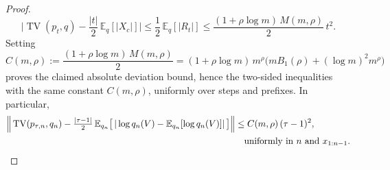 \begin{proof}
\[
\Big|\operatorname{TV}(p_t,q)-\frac{|t|}{2}\,\mathbb{E}_q[|X_c|]\Big|\le \frac12\,\mathbb{E}_q[|R_t|]\le \frac{(1+\rho\log m)\,M(m,\rho)}{2}\,t^2.
\]
Setting
\[
C(m,\rho):=\frac{(1+\rho\log m)\,M(m,\rho)}{2}=(1+\rho\log m)\,m^{\rho}\big(m B_1(\rho)+ (\log m)^2 m^{\rho}\big)
\]
proves the claimed absolute deviation bound, hence the two-sided inequalities with the same constant $C(m,\rho)$, uniformly over steps and prefixes. In particular,
\[
\begin{aligned}
\Big\|\operatorname{TV}(p_{\tau,n},q_n)-\tfrac{|\tau-1|}{2}\,\mathbb{E}_{q_n}\big[\,|\log q_n(V)-\mathbb{E}_{q_n}[\log q_n(V)]|\,\big]\Big\|
&\le C(m,\rho)\,(\tau-1)^2,\\
&\quad \text{uniformly in $n$ and $x_{1:n-1}$}.\qedhere
\end{aligned}
\]
\end{proof}

